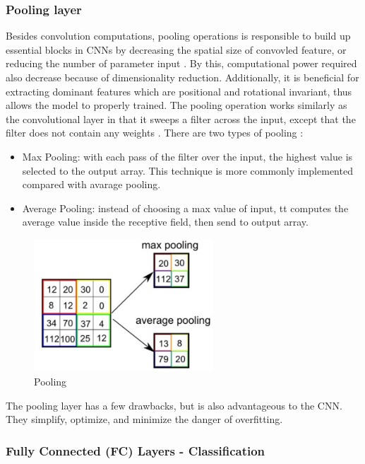 \documentclass[a4paper, 12pt]{article}
\begin{document}
\subsubsection{Pooling layer}
Besides convolution computations, pooling operations is responsible to build up essential blocks in CNNs by decreasing the spatial size of convovled feature, or reducing the number of parameter input \citep{dumoulin2016guide}. By this, computational power required also decrease because of dimensionality reduction. Additionally, it is beneficial for extracting dominant features which are positional and rotational invariant, thus allows the model to properly trained. The pooling operation works similarly as the convolutional layer in that it sweeps a filter across the input, except that the filter does not contain any weights \citep{albawi2017understanding}. There are two types of pooling \citep{ibmConvNet}:

\begin{itemize}
    \item Max Pooling: with each pass of the filter over the input, the highest value is selected to the output array. This technique is more commonly implemented compared with avarage pooling.
    \item Average Pooling: instead of choosing a max value of input, tt computes the average value inside the receptive field, then send to output array.
\end{itemize}

\begin{figure}[H]
    \centering
    \includegraphics[width=0.6\textwidth]{Pooling.png}
    \caption{Pooling}
    \label{Figure Pooling}
\end{figure}

The pooling layer has a few drawbacks, but is also advantageous to the CNN. They simplify, optimize, and minimize the danger of overfitting.

\subsubsection{Fully Connected (FC) Layers - Classification}
\end{document}
